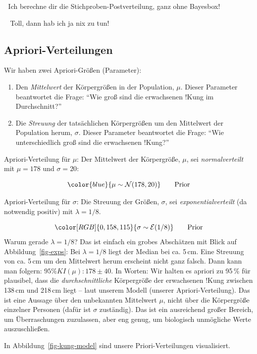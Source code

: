 \documentclass[
  ngerman,
  letterpaper,
  twoside,
  open=any]{scrbook}
\providecommand{\tightlist}{%
  \setlength{\itemsep}{0pt}\setlength{\parskip}{0pt}}\usepackage{longtable,booktabs,array}
\theoremstyle{definition}
\theoremstyle{plain}
\theoremstyle{definition}
\theoremstyle{definition}
\theoremstyle{definition}
\theoremstyle{definition}
\theoremstyle{remark}
\begin{document}
🤖 Ich berechne dir die Stichproben-Postverteilung, ganz ohne Bayesbox!

🧑🏫 Toll, dann hab ich ja nix zu tun!

\subsection{Apriori-Verteilungen}\label{apriori-verteilungen}

Wir haben zwei Apriori-Größen (Parameter):

\begin{enumerate}
\def\labelenumi{\arabic{enumi}.}
\tightlist
\item
  Den \emph{Mittelwert} der Körpergrößen in der Population, \(\mu\).
  Dieser Parameter beantwortet die Frage: \enquote{Wie groß sind die
  erwachsenen !Kung im Durchschnitt?}
\item
  Die \emph{Streuung} der tatsächlichen Körpergrößen um den Mittelwert
  der Population herum, \(\sigma\). Dieser Parameter beantwortet die
  Frage: \enquote{Wie unterschiedlich groß sind die erwachsenen !Kung?}
\end{enumerate}

Apriori-Verteilung für \(\mu\): Der Mittelwert der Körpergröße, \(\mu\),
sei \emph{normalverteilt} mit \(\mu=178\) und \(\sigma=20\):

\[\color{blue}{\mu \sim \mathcal{N}(178, 20)} \qquad{\text{Prior}}\]

Apriori-Verteilung für \(\sigma\): Die Streuung der Größen, \(\sigma\),
sei \emph{exponentialverteilt} (da notwendig positiv) mit
\(\lambda = 1/8\).

\[\color[RGB]{0,158,115}{\sigma \sim \mathcal{E}(1/8)} \qquad{\text{Prior}}\]
Warum gerade \(\lambda=1/8\)? Das ist einfach ein grobes Abschätzen mit
Blick auf Abbildung~\ref{fig-exps}: Bei \(\lambda=1/8\) liegt der Median
bei ca. 5\,cm. Eine Streuung von ca. 5\,cm um den Mittelwert herum
erscheint nicht ganz falsch. Dann kann man folgern:
\(95\%KI(\mu): 178 \pm 40\). In Worten: Wir halten es apriori zu 95\,\%
für plausibel, dass die \emph{durchschnittliche} Körpergröße der
erwachsenen !Kung zwischen 138\,cm und 218\,cm liegt -- laut unserem
Modell (unserer Apriori-Verteilung). Das ist eine Aussage über den
unbekannten Mittelwert \(\mu\), nicht über die Körpergröße einzelner
Personen (dafür ist \(\sigma\) zuständig). Das ist ein ausreichend
großer Bereich, um Überraschungen zuzulassen, aber eng genug, um
biologisch unmögliche Werte auszuschließen.

In Abbildung~\ref{fig-kung-model} sind unsere Priori-Verteilungen
visualisiert.
\end{document}
